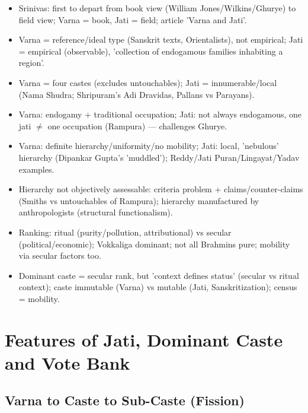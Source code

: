 \begin{QuickRevision}
\begin{itemize}
\item Srinivas: first to depart from book view (William Jones/Wilkins/Ghurye) to field view; Varna = book, Jati = field; article 'Varna and Jati'.
\item Varna = reference/ideal type (Sanskrit texts, Orientalists), not empirical; Jati = empirical (observable), 'collection of endogamous families inhabiting a region'.
\item Varna = four castes (excludes untouchables); Jati = innumerable/local (Nama Shudra; Shripuram's Adi Dravidas, Pallans vs Parayans).
\item Varna: endogamy + traditional occupation; Jati: not always endogamous, one jati $\neq$ one occupation (Rampura) --- challenges Ghurye.
\item Varna: definite hierarchy/uniformity/no mobility; Jati: local, 'nebulous' hierarchy (Dipankar Gupta's 'muddled'); Reddy/Jati Puran/Lingayat/Yadav examples.
\item Hierarchy not objectively assessable: criteria problem + claims/counter-claims (Smiths vs untouchables of Rampura); hierarchy manufactured by anthropologists (structural functionalism).
\item Ranking: ritual (purity/pollution, attributional) vs secular (political/economic); Vokkaliga dominant; not all Brahmins pure; mobility via secular factors too.
\item Dominant caste = secular rank, but 'context defines status' (secular vs ritual context); caste immutable (Varna) vs mutable (Jati, Sanskritization); census = mobility.
\end{itemize}
\end{QuickRevision}

\section{Features of Jati, Dominant Caste and Vote Bank}

\subsection{Varna  to  Caste  to  Sub-Caste (Fission)}

